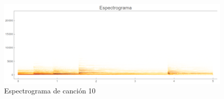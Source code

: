 \documentclass[12pt, letterpaper]{article}
\begin{document}
\begin{figure}[H]
  \centering
  \includegraphics[width=.9\linewidth]{imgs/Cancion10/espectrograma.png}
  \caption{Espectrograma de canción 10}
  \label{fig:10i}
\end{figure}




\end{document}
